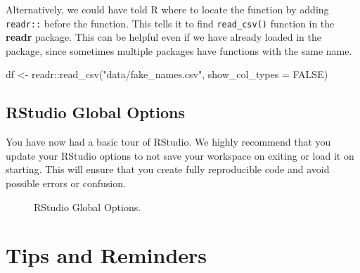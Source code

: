 \documentclass[
  letterpaper,
]{krantz}
\makeatletter
\newenvironment{Shaded}{\begin{snugshade}}{\end{snugshade}}
\newcommand{\AttributeTok}[1]{\textcolor[rgb]{0.40,0.45,0.13}{#1}}
\newcommand{\ConstantTok}[1]{\textcolor[rgb]{0.56,0.35,0.01}{#1}}
\newcommand{\FunctionTok}[1]{\textcolor[rgb]{0.28,0.35,0.67}{#1}}
\newcommand{\NormalTok}[1]{\textcolor[rgb]{0.00,0.23,0.31}{#1}}
\newcommand{\OtherTok}[1]{\textcolor[rgb]{0.00,0.23,0.31}{#1}}
\newcommand{\SpecialCharTok}[1]{\textcolor[rgb]{0.37,0.37,0.37}{#1}}
\newcommand{\StringTok}[1]{\textcolor[rgb]{0.13,0.47,0.30}{#1}}
\newenvironment{kframe}{%
\medskip{}
\setlength{\fboxsep}{.8em}
 \def\at@end@of@kframe{}%
 \ifinner\ifhmode%
  \def\at@end@of@kframe{\end{minipage}}%
  \begin{minipage}{\columnwidth}%
 \fi\fi%
 \def\FrameCommand##1{\hskip\@totalleftmargin \hskip-\fboxsep
 \colorbox{shadecolor}{##1}\hskip-\fboxsep
     \hskip-\linewidth \hskip-\@totalleftmargin \hskip\columnwidth}%
 \MakeFramed {\advance\hsize-\width
   \@totalleftmargin\z@ \linewidth\hsize
   \@setminipage}}%
 {\par\unskip\endMakeFramed%
 \at@end@of@kframe}
\renewenvironment{Shaded}{\begin{kframe}}{\end{kframe}}
\makeatother
\begin{document}
Alternatively, we could have told R where to locate the function by
adding \texttt{readr::} before the function. This tells it to find
\texttt{read\_csv()} function in the \textbf{readr} package. This can be
helpful even if we have already loaded in the package, since sometimes
multiple packages have functions with the same name.

\begin{Shaded}
\begin{Highlighting}[]
\NormalTok{df }\OtherTok{\textless{}{-}}\NormalTok{ readr}\SpecialCharTok{::}\FunctionTok{read\_csv}\NormalTok{(}\StringTok{"data/fake\_names.csv"}\NormalTok{, }\AttributeTok{show\_col\_types =} \ConstantTok{FALSE}\NormalTok{)}
\end{Highlighting}
\end{Shaded}

\subsection{RStudio Global Options}\label{rstudio-global-options}

You have now had a basic tour of RStudio. We highly recommend that you
update your RStudio options to not save your workspace on exiting or
load it on starting. This will ensure that you create fully reproducible
code and avoid possible errors or confusion.

\begin{figure}


\caption{\label{fig-global-options}RStudio Global Options.}

\end{figure}%

\section{Tips and Reminders}\label{tips-and-reminders}
\end{document}
